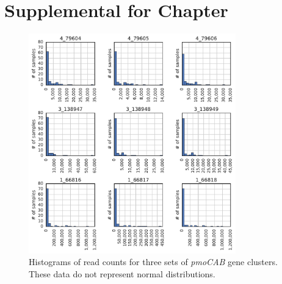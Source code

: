 \chapter{Supplemental for Chapter }

\begin{figure}[H]
\centering
    \includegraphics[width=0.8\textwidth]{./tex/chapter3/figures/170403_read_count_distributions--3_pmoCAB_clusters.pdf}
    \begin{singlespace}
    \caption[]{
        Histograms of read counts for three sets of \textit{pmoCAB} gene clusters.
        These data do not represent normal distributions.
        }
    \label{fig:pmoCAB_expressions}
    \end{singlespace}
\end{figure}


